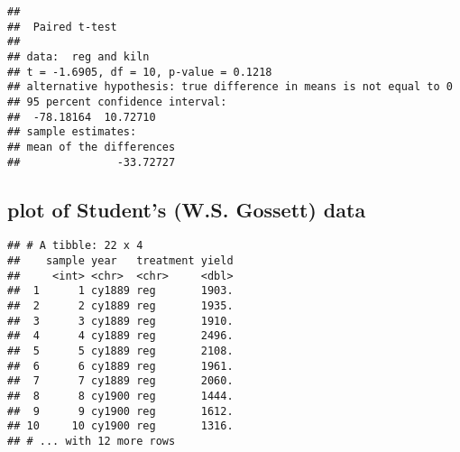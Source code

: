 \documentclass[]{book}
\newenvironment{Shaded}{\begin{snugshade}}{\end{snugshade}}
\newcommand{\DataTypeTok}[1]{\textcolor[rgb]{0.13,0.29,0.53}{#1}}
\newcommand{\FloatTok}[1]{\textcolor[rgb]{0.00,0.00,0.81}{#1}}
\newcommand{\KeywordTok}[1]{\textcolor[rgb]{0.13,0.29,0.53}{\textbf{#1}}}
\newcommand{\NormalTok}[1]{#1}
\newcommand{\OperatorTok}[1]{\textcolor[rgb]{0.81,0.36,0.00}{\textbf{#1}}}
\newcommand{\OtherTok}[1]{\textcolor[rgb]{0.56,0.35,0.01}{#1}}
\newcommand{\StringTok}[1]{\textcolor[rgb]{0.31,0.60,0.02}{#1}}
\theoremstyle{definition}
\theoremstyle{definition}
\theoremstyle{definition}
\theoremstyle{remark}
\begin{document}
\begin{Shaded}
\end{Shaded}

\begin{verbatim}
## 
##  Paired t-test
## 
## data:  reg and kiln
## t = -1.6905, df = 10, p-value = 0.1218
## alternative hypothesis: true difference in means is not equal to 0
## 95 percent confidence interval:
##  -78.18164  10.72710
## sample estimates:
## mean of the differences 
##               -33.72727
\end{verbatim}

\hypertarget{plot-of-students-w.s.-gossett-data}{%
\subsection{plot of Student's (W.S. Gossett)
data}\label{plot-of-students-w.s.-gossett-data}}

\begin{Shaded}
\end{Shaded}

\begin{verbatim}
## # A tibble: 22 x 4
##    sample year   treatment yield
##     <int> <chr>  <chr>     <dbl>
##  1      1 cy1889 reg       1903.
##  2      2 cy1889 reg       1935.
##  3      3 cy1889 reg       1910.
##  4      4 cy1889 reg       2496.
##  5      5 cy1889 reg       2108.
##  6      6 cy1889 reg       1961.
##  7      7 cy1889 reg       2060.
##  8      8 cy1900 reg       1444.
##  9      9 cy1900 reg       1612.
## 10     10 cy1900 reg       1316.
## # ... with 12 more rows
\end{verbatim}
\end{document}
